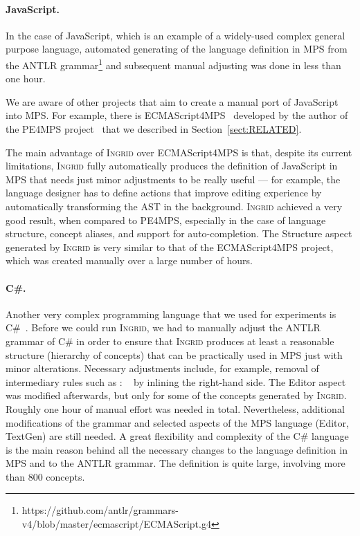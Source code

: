 \paragraph{JavaScript.}
In the case of JavaScript, which is an example of a widely-used complex general purpose language, automated generating of the language definition in MPS from the ANTLR grammar\footnote{https://github.com/antlr/grammars-v4/blob/master/ecmascript/ECMAScript.g4} and subsequent manual adjusting was done in less than one hour.

We are aware of other projects that aim to create a manual port of JavaScript into MPS.
For example, there is ECMAScript4MPS~\cite{ref:ECMA4MPS} developed by the author of the PE4MPS project~\cite{ref:PE4MPS} that we described in Section~\ref{sect:RELATED}.

The main advantage of \textsc{Ingrid} over ECMAScript4MPS is that, despite its current limitations, \textsc{Ingrid} fully automatically produces the definition of JavaScript in MPS that needs just minor adjustments to be really useful --- for example, the language designer has to define actions that improve editing experience by automatically transforming the AST in the background.
\textsc{Ingrid} achieved a very good result, when compared to PE4MPS, especially in the case of language structure, concept aliases, and support for auto-completion.
The Structure aspect generated by \textsc{Ingrid} is very similar to that of the ECMAScript4MPS project, which was created manually over a large number of hours.

\paragraph{C\#.}
Another very complex programming language that we used for experiments is C\#~\cite{ref:CSHARP}.
Before we could run \textsc{Ingrid}, we had to manually adjust the ANTLR grammar of C\# in order to ensure that \textsc{Ingrid} produces at least a reasonable structure (hierarchy of concepts) that can be practically used in MPS just with minor alterations.
Necessary adjustments include, for example, removal of intermediary rules such as  : ~\antlrliteral{;} by inlining the right-hand side.
The Editor aspect was modified afterwards, but only for some of the concepts generated by \textsc{Ingrid}. 
Roughly one hour of manual effort was needed in total.
Nevertheless, additional modifications of the grammar and selected aspects of the MPS language (Editor, TextGen) are still needed.
A great flexibility and complexity of the C\# language is the main reason behind all the necessary changes to the language definition in MPS and to the ANTLR grammar.
The definition is quite large, involving more than 800 concepts.


